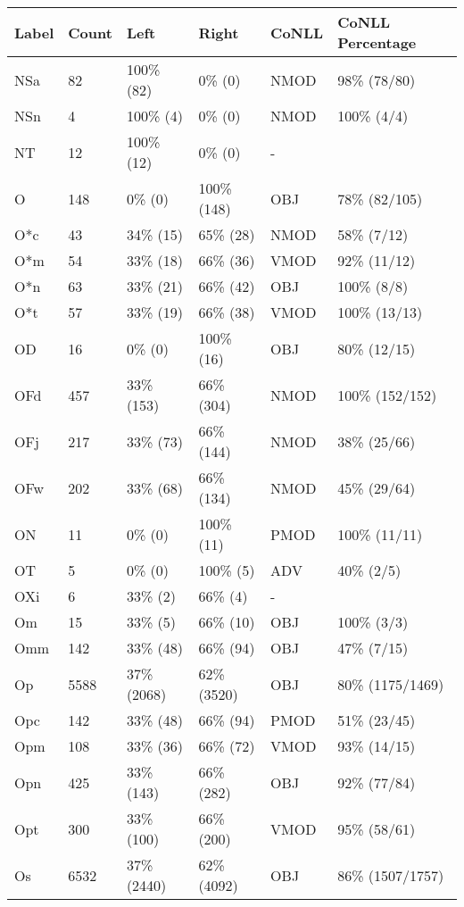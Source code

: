 \begin{figure*}
\begin{tabular}{|l|l|l|l||l|l|}
\hline
Label & Count & Left & Right & CoNLL & CoNLL Percentage\\ 
\hline
 NSa & 82 & 100\% (82) & 0\% (0) & NMOD & 98\% (78/80) \\ 
\hline
 NSn & 4 & 100\% (4) & 0\% (0) & NMOD & 100\% (4/4) \\ 
\hline
 NT & 12 & 100\% (12) & 0\% (0) & - &  \\ 
\hline
 O & 148 & 0\% (0) & 100\% (148) & OBJ & 78\% (82/105) \\ 
\hline
 O*c & 43 & 34\% (15) & 65\% (28) & NMOD & 58\% (7/12) \\ 
\hline
 O*m & 54 & 33\% (18) & 66\% (36) & VMOD & 92\% (11/12) \\ 
\hline
 O*n & 63 & 33\% (21) & 66\% (42) & OBJ & 100\% (8/8) \\ 
\hline
 O*t & 57 & 33\% (19) & 66\% (38) & VMOD & 100\% (13/13) \\ 
\hline
 OD & 16 & 0\% (0) & 100\% (16) & OBJ & 80\% (12/15) \\ 
\hline
 OFd & 457 & 33\% (153) & 66\% (304) & NMOD & 100\% (152/152) \\ 
\hline
 OFj & 217 & 33\% (73) & 66\% (144) & NMOD & 38\% (25/66) \\ 
\hline
 OFw & 202 & 33\% (68) & 66\% (134) & NMOD & 45\% (29/64) \\ 
\hline
 ON & 11 & 0\% (0) & 100\% (11) & PMOD & 100\% (11/11) \\ 
\hline
 OT & 5 & 0\% (0) & 100\% (5) & ADV & 40\% (2/5) \\ 
\hline
 OXi & 6 & 33\% (2) & 66\% (4) & - &  \\ 
\hline
 Om & 15 & 33\% (5) & 66\% (10) & OBJ & 100\% (3/3) \\ 
\hline
 Omm & 142 & 33\% (48) & 66\% (94) & OBJ & 47\% (7/15) \\ 
\hline
 Op & 5588 & 37\% (2068) & 62\% (3520) & OBJ & 80\% (1175/1469) \\ 
\hline
 Opc & 142 & 33\% (48) & 66\% (94) & PMOD & 51\% (23/45) \\ 
\hline
 Opm & 108 & 33\% (36) & 66\% (72) & VMOD & 93\% (14/15) \\ 
\hline
 Opn & 425 & 33\% (143) & 66\% (282) & OBJ & 92\% (77/84) \\ 
\hline
 Opt & 300 & 33\% (100) & 66\% (200) & VMOD & 95\% (58/61) \\ 
\hline
 Os & 6532 & 37\% (2440) & 62\% (4092) & OBJ & 86\% (1507/1757) \\ 

\end{tabular}
\end{figure*}
